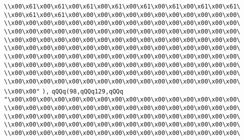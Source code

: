 \verb|\\x00\x61\x00\x61\x00\x61\x00\x61\x00\x61\x00\x61\x00\x61\x00\x61\|\newline
\verb|\\x00\x61\x00\x61\x00\x00\x00\x00\x00\x00\x00\x00\x00\x00\x00\x00\|\newline
\verb|\\x00\x00\x00\x00\x00\x00\x00\x00\x00\x00\x00\x00\x00\x00\x00\x00\|\newline
\verb|\\x00\x00\x00\x00\x00\x00\x00\x00\x00\x00\x00\x00\x00\x00\x00\x00\|\newline
\verb|\\x00\x00\x00\x00\x00\x00\x00\x00\x00\x00\x00\x00\x00\x00\x00\x00\|\newline
\verb|\\x00\x00\x00\x00\x00\x00\x00\x00\x00\x00\x00\x00\x00\x00\x00\x00\|\newline
\verb|\\x00\x00\x00\x00\x00\x00\x00\x00\x00\x00\x00\x00\x00\x00\x00\x00\|\newline
\verb|\\x00\x00\x00\x00\x00\x00\x00\x00\x00\x00\x00\x00\x00\x00\x00\x00\|\newline
\verb|\\x00\x00\x00\x00\x00\x00\x00\x00\x00\x00\x00\x00\x00\x00\x00\x00\|\newline
\verb|\\x00\x00\x00\x00\x00\x00\x00\x00\x00\x00\x00\x00\x00\x00\x00\x00\|\newline
\verb|\\x00\x00"|\newline
\verb|),|\newline
\verb|qQQq(98,qQQq129,qQQq|\newline
\verb|"\x00\x00\x00\x00\x00\x00\x00\x00\x00\x00\x00\x00\x00\x00\x00\x00\|\newline
\verb|\\x00\x00\x00\x00\x00\x00\x00\x00\x00\x00\x00\x00\x00\x00\x00\x00\|\newline
\verb|\\x00\x00\x00\x00\x00\x00\x00\x00\x00\x00\x00\x00\x00\x00\x00\x00\|\newline
\verb|\\x00\x00\x00\x00\x00\x00\x00\x00\x00\x00\x00\x00\x00\x00\x00\x00\|\newline
\verb|\\x00\x00\x00\x00\x00\x00\x00\x00\x00\x00\x00\x00\x00\x00\x00\x00\|\newline
